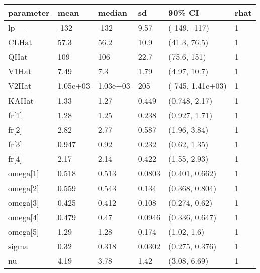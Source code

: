 
\begin{tabular}{l|l|l|l|l|l}
\hline
parameter & mean & median & sd & 90\% CI & rhat\\
\hline
lp\_\_ & -132 & -132 & 9.57 & (-149, -117) & 1\\
\hline
CLHat & 57.3 & 56.2 & 10.9 & (41.3, 76.5) & 1\\
\hline
QHat & 109 & 106 & 22.7 & (75.6,  151) & 1\\
\hline
V1Hat & 7.49 & 7.3 & 1.79 & (4.97, 10.7) & 1\\
\hline
V2Hat & 1.05e+03 & 1.03e+03 & 205 & ( 745, 1.41e+03) & 1\\
\hline
KAHat & 1.33 & 1.27 & 0.449 & (0.748, 2.17) & 1\\
\hline
fr[1] & 1.28 & 1.25 & 0.238 & (0.927, 1.71) & 1\\
\hline
fr[2] & 2.82 & 2.77 & 0.587 & (1.96, 3.84) & 1\\
\hline
fr[3] & 0.947 & 0.92 & 0.232 & (0.62, 1.35) & 1\\
\hline
fr[4] & 2.17 & 2.14 & 0.422 & (1.55, 2.93) & 1\\
\hline
omega[1] & 0.518 & 0.513 & 0.0803 & (0.401, 0.662) & 1\\
\hline
omega[2] & 0.559 & 0.543 & 0.134 & (0.368, 0.804) & 1\\
\hline
omega[3] & 0.425 & 0.412 & 0.108 & (0.274, 0.62) & 1\\
\hline
omega[4] & 0.479 & 0.47 & 0.0946 & (0.336, 0.647) & 1\\
\hline
omega[5] & 1.29 & 1.28 & 0.174 & (1.02,  1.6) & 1\\
\hline
sigma & 0.32 & 0.318 & 0.0302 & (0.275, 0.376) & 1\\
\hline
nu & 4.19 & 3.78 & 1.42 & (3.08, 6.69) & 1\\
\hline
\end{tabular}
